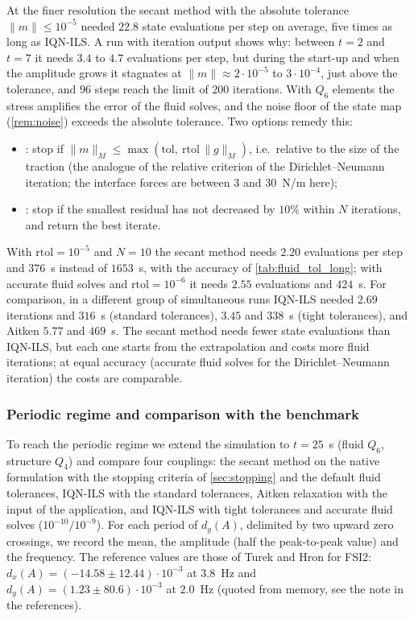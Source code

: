 \documentclass[11pt,a4paper]{article}
\theoremstyle{definition}
\theoremstyle{remark}
\newcommand{\M}{M}
\begin{document}
At the finer resolution the secant method with the absolute tolerance $\|m\|\le10^{-5}$ needed
$22.8$ state evaluations per step on average, five times as long as IQN-ILS. A run with iteration
output shows why: between $t=2$ and $t=7$ it needs $3.4$ to $4.7$ evaluations per step, but during
the start-up and when the amplitude grows it stagnates at $\|m\|\approx2\cdot10^{-5}$ to
$3\cdot10^{-4}$, just above the tolerance, and $96$ steps reach the limit of $200$ iterations.
With $Q_6$ elements the stress amplifies the error of the fluid solves, and the noise floor of the
state map (\cref{rem:noise}) exceeds the absolute tolerance. Two options remedy this:
\begin{itemize}
\item {}: stop if $\|m\|_\M\le\max(\mathrm{tol},\
\mathrm{rtol}\,\|g\|_\M)$, i.e.\ relative to the size of the traction (the analogue of the relative
criterion of the Dirichlet--Neumann iteration; the interface forces are between $3$ and
$30$~N/m here);
\item {}: stop if the smallest residual has not decreased by $10\%$
within $N$ iterations, and return the best iterate.
\end{itemize}
With $\mathrm{rtol}=10^{-5}$ and $N=10$ the secant method needs $2.20$ evaluations per step and
$376$~s instead of $1653$~s, with the accuracy of \cref{tab:fluid_tol_long}; with accurate fluid
solves and $\mathrm{rtol}=10^{-6}$ it needs $2.55$ evaluations and $424$~s. For comparison, in a
different group of simultaneous runs IQN-ILS needed $2.69$ iterations and $316$~s (standard
tolerances), $3.45$ and $338$~s (tight tolerances), and Aitken $5.77$ and $469$~s. The secant method
needs fewer state evaluations than IQN-ILS, but each one starts from the extrapolation and costs
more fluid iterations; at equal accuracy (accurate fluid solves for the Dirichlet--Neumann
iteration) the costs are comparable.

\subsubsection{Periodic regime and comparison with the benchmark}\label{sec:benchmark}

To reach the periodic regime we extend the simulation to $t=25$~s (fluid $Q_6$, structure $Q_4$)
and compare four couplings: the secant method on the native formulation with the stopping
criteria of \cref{sec:stopping} and the default fluid tolerances, IQN-ILS with the standard
tolerances, Aitken relaxation with the input of the application, and IQN-ILS with tight
tolerances and accurate fluid solves ($10^{-10}/10^{-9}$). For each period of $d_y(A)$, delimited
by two upward zero crossings, we record the mean, the amplitude (half the peak-to-peak value) and
the frequency. The reference values are those of Turek and Hron \cite{TurekHron2006} for FSI2:
$d_x(A)=(-14.58\pm12.44)\cdot10^{-3}$ at $3.8$~Hz and $d_y(A)=(1.23\pm80.6)\cdot10^{-3}$ at
$2.0$~Hz (quoted from memory, see the note in the references).
\end{document}
